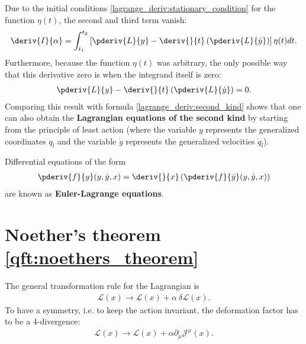     Due to the initial conditions \ref{lagrange_deriv:stationary_condition} for the function $\eta(t)$, the second and third term vanish:
    \begin{gather}
        \label{lagrange_deriv:final_integral}
        \deriv{I}{\alpha}=\int_{t_1}^{t_2}\left[\pderiv{L}{y} - \deriv{}{t}\left(\pderiv{L}{\dot{y}}\right)\right]\eta(t)dt.
    \end{gather}
    Furthermore, because the function $\eta(t)$ was arbitrary, the only possible way that this derivative zero is when the integrand itself is zero:
    \begin{gather}
        \label{lagrange_deriv:second_kind_with_hamilton}
        \pderiv{L}{y} - \deriv{}{t}\left(\pderiv{L}{\dot{y}}\right) = 0.
    \end{gather}
    Comparing this result with formula \ref{lagrange_deriv:second_kind} shows that one can also obtain the \textbf{Lagrangian equations of the second kind} by starting from the principle of least action (where the variable $y$ represents the generalized coordinates $q_l$ and the variable $\dot{y}$ represents the generalized velocities $\dot{q}_l$).

    \begin{remark}
        Differential equations of the form
        \begin{gather}
            \label{lagrange_deriv:euler_lagrange_equation}
            \pderiv{f}{y}(y, \dot{y}, x) = \deriv{}{x}\left(\pderiv{f}{\dot{y}}(y, \dot{y}, x)\right)
        \end{gather}
        are known as \textbf{Euler-Lagrange equations}.
    \end{remark}

\section{Noether's theorem \ref{qft:noethers_theorem}}\label{proof:noether}

    The general transformation rule for the Lagrangian is
    \begin{gather}
        \label{noether_deriv:1}
        \mathcal{L}(x)\rightarrow\mathcal{L}(x) + \alpha\ \delta\mathcal{L}(x).
    \end{gather}
    To have a symmetry, i.e. to keep the action invariant, the deformation factor has to be a 4-divergence:
    \begin{gather}
        \label{noether_deriv:2}
        \mathcal{L}(x)\rightarrow\mathcal{L}(x) + \alpha\partial_\mu\mathcal{J}^\mu(x).
    \end{gather}

